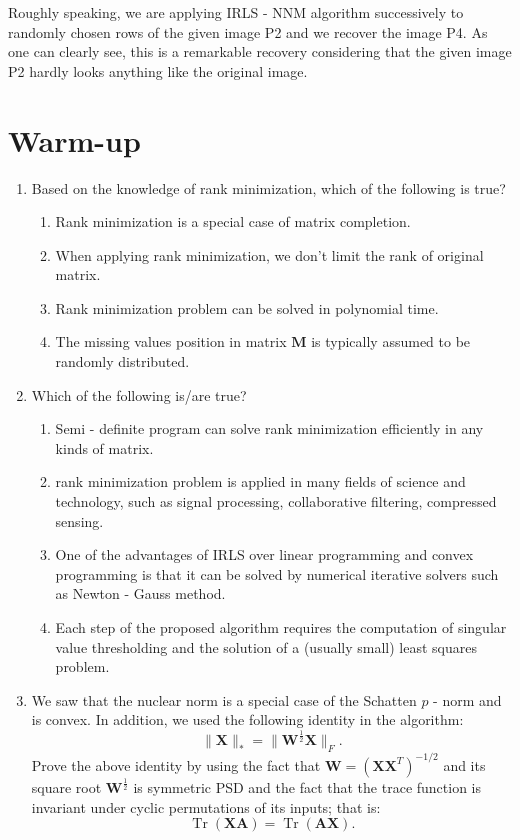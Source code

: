 \documentclass[12pt]{article}
\def \bA{\boldsymbol{A}}
\def \bX{\boldsymbol{X}}
\def \bW{\boldsymbol{W}}
\def \bM{\boldsymbol{M}}
\DeclareMathOperator{\Tr}{Tr}
\begin{document}
Roughly speaking, we are applying IRLS - NNM algorithm successively to randomly chosen rows of the given image P2 and we recover the image P4. As one can clearly see, this is a remarkable recovery considering that the given image P2 hardly looks anything like the original image. 
\section{Warm-up}
\begin{enumerate}
\item Based on the knowledge of rank minimization, which of the following is true?
    \begin{enumerate} 
        \item Rank minimization is a special case of matrix completion.

        \item When applying rank minimization, we don't limit the rank of original matrix.

        \item  Rank minimization problem can be solved in polynomial time.

        \item The missing values position in matrix $\bM$ is typically assumed to be randomly distributed. 
    \end{enumerate}

\item Which of the following is/are true?

    \begin{enumerate}

        \item Semi - definite program can solve rank minimization efficiently
        in any kinds of matrix.

        \item rank minimization problem is applied in many fields of science and technology, such as signal processing, collaborative filtering, compressed sensing.

        \item One of the advantages of IRLS over linear programming and convex programming is that it can be solved by numerical iterative solvers such as Newton - Gauss method. 

        \item Each step of the proposed algorithm requires the computation of singular value thresholding and the solution of a (usually small) least squares problem.
    \end{enumerate}
    
\item We saw that the nuclear norm is a special case of the Schatten $p$ -  norm and is convex. In addition, we used the following identity in the algorithm:
\[\|\bX\|_* = \|\bW^{\frac 12}\bX\|_F.\]
Prove the above identity by using the fact that $\bW = (\bX\bX^T)^{-1/2}$ and its square root $\bW^{\frac 12}$ is symmetric PSD and the fact that the trace function is invariant under cyclic permutations of its inputs; that is:
\[\Tr(\bX\bA) = \Tr(\bA\bX).\]
\end{enumerate}
\end{document}
